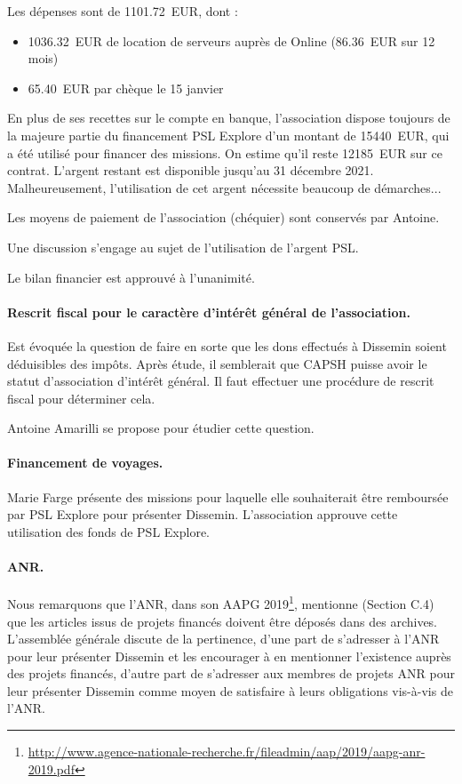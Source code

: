 \documentclass{scrartcl}
\begin{document}
Les dépenses sont de 1101.72~EUR, dont :

\begin{itemize}
  \item 1036.32~EUR de location de serveurs auprès de Online (86.36~EUR sur 12
    mois)
  \item 65.40~EUR par chèque le 15 janvier
\end{itemize}

En plus de ses recettes sur le compte en banque, l'association dispose toujours
de la majeure partie du financement PSL Explore d'un montant de 15440~EUR, qui a
été utilisé pour financer des missions. 
On estime qu'il reste 12185~EUR sur ce contrat.
L'argent restant est disponible jusqu'au
31 décembre 2021. Malheureusement, l'utilisation de cet argent nécessite
beaucoup de démarches...

Les moyens de paiement de l'association (chéquier) sont conservés par Antoine.

Une discussion s'engage au sujet de l'utilisation de l'argent PSL.

Le bilan financier est approuvé à l'unanimité.

\paragraph{Rescrit fiscal pour le caractère d'intérêt général de l'association.}
Est évoquée la question de faire en sorte que les dons effectués à Dissemin
soient déduisibles des impôts. Après étude, il semblerait que CAPSH puisse avoir
le statut d'association d'intérêt général. Il faut effectuer une procédure de
rescrit fiscal pour déterminer cela.

Antoine Amarilli se propose pour étudier cette question.

\paragraph{Financement de voyages.}
Marie Farge présente des missions pour laquelle elle souhaiterait être
remboursée par PSL Explore pour présenter Dissemin. L'association approuve cette
utilisation des fonds de PSL Explore.

\paragraph{ANR.}
Nous remarquons que l'ANR, dans son AAPG 2019\footnote{\url{http://www.agence-nationale-recherche.fr/fileadmin/aap/2019/aapg-anr-2019.pdf}}, mentionne (Section C.4) que les
articles issus de projets financés doivent être déposés dans des archives.
L'assemblée générale discute de la pertinence, d'une part de s'adresser à l'ANR
pour leur présenter Dissemin et les encourager à en mentionner l'existence
auprès des projets financés, d'autre part de s'adresser aux membres de projets
ANR pour leur présenter Dissemin comme moyen de satisfaire à leurs obligations
vis-à-vis de l'ANR.
\end{document}
